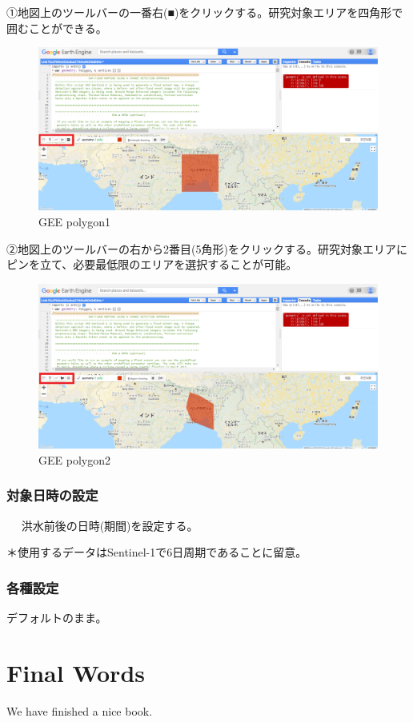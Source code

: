 \documentclass[
]{book}
\begin{document}
①地図上のツールバーの一番右(■)をクリックする。研究対象エリアを四角形で囲むことができる。

\begin{figure}
\centering
\includegraphics{images/geepolygon1.png}
\caption{GEE polygon1}
\end{figure}

②地図上のツールバーの右から2番目(5角形)をクリックする。研究対象エリアにピンを立て、必要最低限のエリアを選択することが可能。　　

\begin{figure}
\centering
\includegraphics{images/geepolygon2.png}
\caption{GEE polygon2}
\end{figure}

\hypertarget{ux5bfeux8c61ux65e5ux6642ux306eux8a2dux5b9a}{%
\subsection{対象日時の設定　　}\label{ux5bfeux8c61ux65e5ux6642ux306eux8a2dux5b9a}}

　
洪水前後の日時(期間)を設定する。　　

＊使用するデータはSentinel-1で6日周期であることに留意。

\hypertarget{ux5404ux7a2eux8a2dux5b9a}{%
\subsection{各種設定}\label{ux5404ux7a2eux8a2dux5b9a}}

デフォルトのまま。

\hypertarget{final-words}{%
\chapter{Final Words}\label{final-words}}

We have finished a nice book.

  
\end{document}
